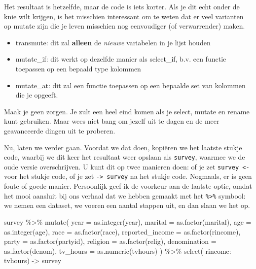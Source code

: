 \documentclass[]{tufte-book}
\newenvironment{Shaded}{}{}
\newcommand{\AttributeTok}[1]{\textcolor[rgb]{0.49,0.56,0.16}{#1}}
\newcommand{\FunctionTok}[1]{\textcolor[rgb]{0.02,0.16,0.49}{#1}}
\newcommand{\NormalTok}[1]{#1}
\newcommand{\OtherTok}[1]{\textcolor[rgb]{0.00,0.44,0.13}{#1}}
\newcommand{\SpecialCharTok}[1]{\textcolor[rgb]{0.25,0.44,0.63}{#1}}
\providecommand{\tightlist}{%
  \setlength{\itemsep}{0pt}\setlength{\parskip}{0pt}}
\begin{document}
Het resultaat is hetzelfde, maar de code is iets korter. Als je dit echt onder de knie wilt krijgen, is het misschien interessant om te weten dat er veel varianten op mutate zijn die je leven misschien nog eenvoudiger (of verwarrender) maken.

\begin{itemize}
\tightlist
\item
  transmute: dit zal \textbf{alleen} de \emph{nieuwe} variabelen in je lijst houden
\item
  mutate\_if: dit werkt op dezelfde manier als select\_if, b.v. een functie toepassen op een bepaald type kolommen
\item
  mutate\_at: dit zal een functie toepassen op een bepaalde set van kolommen die je opgeeft.
\end{itemize}

Maak je geen zorgen. Je zult een heel eind komen als je select, mutate en rename kunt gebruiken. Maar wees niet bang om jezelf uit te dagen en de meer geavanceerde dingen uit te proberen.

Nu, laten we verder gaan. Voordat we dat doen, kopiëren we het laatste stukje code, waarbij we dit keer het resultaat weer opslaan als \texttt{survey}, waarmee we de oude versie overschrijven. U kunt dit op twee manieren doen: of je zet \texttt{survey\ \textless{}-} voor het stukje code, of je zet \texttt{-\textgreater{}\ survey} na het stukje code. Nogmaals, er is geen foute of goede manier. Persoonlijk geef ik de voorkeur aan de laatste optie, omdat het mooi aansluit bij ons verhaal dat we hebben gemaakt met het \texttt{\%\textgreater{}\%} symbool: we nemen een dataset, we voeren een aantal stappen uit, en dan slaan we het op.

\begin{Shaded}
\begin{Highlighting}[]
\NormalTok{survey }\SpecialCharTok{\%\textgreater{}\%}
  \FunctionTok{mutate}\NormalTok{(}
    \AttributeTok{year =} \FunctionTok{as.integer}\NormalTok{(year),}
    \AttributeTok{marital =} \FunctionTok{as.factor}\NormalTok{(marital),}
    \AttributeTok{age =} \FunctionTok{as.integer}\NormalTok{(age),}
    \AttributeTok{race =} \FunctionTok{as.factor}\NormalTok{(race),}
    \AttributeTok{reported\_income =} \FunctionTok{as.factor}\NormalTok{(rincome),}
    \AttributeTok{party =} \FunctionTok{as.factor}\NormalTok{(partyid),}
    \AttributeTok{religion =} \FunctionTok{as.factor}\NormalTok{(relig),}
    \AttributeTok{denomination =} \FunctionTok{as.factor}\NormalTok{(denom),}
    \AttributeTok{tv\_hours =} \FunctionTok{as.numeric}\NormalTok{(tvhours)}
\NormalTok{  ) }\SpecialCharTok{\%\textgreater{}\%}
  \FunctionTok{select}\NormalTok{(}\SpecialCharTok{{-}}\NormalTok{rincome}\SpecialCharTok{:{-}}\NormalTok{tvhours) }\OtherTok{{-}\textgreater{}}\NormalTok{ survey}
\end{Highlighting}
\end{Shaded}
\end{document}
